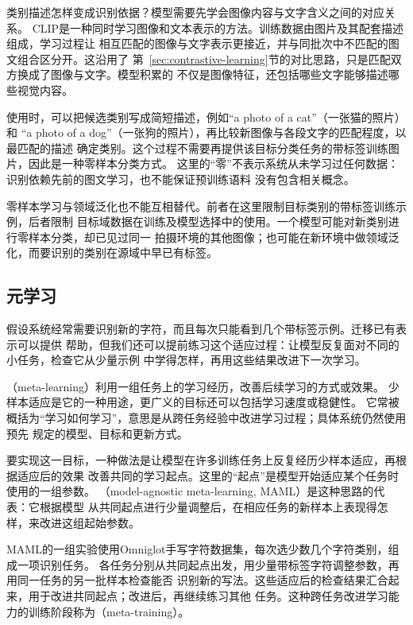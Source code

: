 类别描述怎样变成识别依据？模型需要先学会图像内容与文字含义之间的对应关系。
CLIP是一种同时学习图像和文本表示的方法。训练数据由图片及其配套描述组成，学习过程让
相互匹配的图像与文字表示更接近，并与同批次中不匹配的图文组合区分开。这沿用了
第~\ref{sec:contrastive-learning}节的对比思路，只是匹配双方换成了图像与文字。模型积累的
不仅是图像特征，还包括哪些文字能够描述哪些视觉内容。

使用时，可以把候选类别写成简短描述，例如“a photo of a cat”（一张猫的照片）和
“a photo of a dog”（一张狗的照片），再比较新图像与各段文字的匹配程度，以最匹配的描述
确定类别。这个过程不需要再提供该目标分类任务的带标签训练图片，因此是一种零样本分类方式。
这里的“零”不表示系统从未学习过任何数据：识别依赖先前的图文学习，也不能保证预训练语料
没有包含相关概念。

零样本学习与领域泛化也不能互相替代。前者在这里限制目标类别的带标签训练示例，后者限制
目标域数据在训练及模型选择中的使用。一个模型可能对新类别进行零样本分类，却已见过同一
拍摄环境的其他图像；也可能在新环境中做领域泛化，而要识别的类别在源域中早已有标签。

\subsection{元学习}
\label{sec:meta-learning}

假设系统经常需要识别新的字符，而且每次只能看到几个带标签示例。迁移已有表示可以提供
帮助，但我们还可以提前练习这个适应过程：让模型反复面对不同的小任务，检查它从少量示例
中学得怎样，再用这些结果改进下一次学习。

（meta-learning）利用一组任务上的学习经历，改善后续学习的方式或效果。
少样本适应是它的一种用途，更广义的目标还可以包括学习速度或稳健性。
它常被概括为“学习如何学习”，意思是从跨任务经验中改进学习过程；具体系统仍然使用预先
规定的模型、目标和更新方式。

要实现这一目标，一种做法是让模型在许多训练任务上反复经历少样本适应，再根据适应后的效果
改善共同的学习起点。这里的“起点”是模型开始适应某个任务时使用的一组参数。
（model-agnostic meta-learning, MAML）是这种思路的代表：它根据模型
从共同起点进行少量调整后，在相应任务的新样本上表现得怎样，来改进这组起始参数。

MAML的一组实验使用Omniglot手写字符数据集，每次选少数几个字符类别，组成一项识别任务。
各任务分别从共同起点出发，用少量带标签字符调整参数，再用同一任务的另一批样本检查能否
识别新的写法。这些适应后的检查结果汇合起来，用于改进共同起点；改进后，再继续练习其他
任务。这种跨任务改进学习能力的训练阶段称为（meta-training）。

